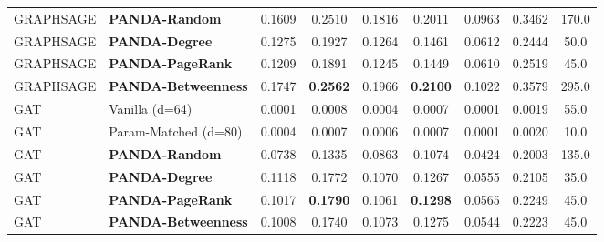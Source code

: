 \begin{table}[t]
{\begin{tabular}{llccccccc}
GRAPHSAGE & \textbf{PANDA-Random} & 0.1609 & 0.2510 & 0.1816 & 0.2011 & 0.0963 & 0.3462 & 170.0 \\
GRAPHSAGE & \textbf{PANDA-Degree} & 0.1275 & 0.1927 & 0.1264 & 0.1461 & 0.0612 & 0.2444 & 50.0 \\
GRAPHSAGE & \textbf{PANDA-PageRank} & 0.1209 & 0.1891 & 0.1245 & 0.1449 & 0.0610 & 0.2519 & 45.0 \\
GRAPHSAGE & \textbf{PANDA-Betweenness} & 0.1747 & \textbf{0.2562} & 0.1966 & \textbf{0.2100} & 0.1022 & 0.3579 & 295.0 \\
\midrule
GAT & Vanilla (d=64) & 0.0001 & 0.0008 & 0.0004 & 0.0007 & 0.0001 & 0.0019 & 55.0 \\
GAT & Param-Matched (d=80) & 0.0004 & 0.0007 & 0.0006 & 0.0007 & 0.0001 & 0.0020 & 10.0 \\
GAT & \textbf{PANDA-Random} & 0.0738 & 0.1335 & 0.0863 & 0.1074 & 0.0424 & 0.2003 & 135.0 \\
GAT & \textbf{PANDA-Degree} & 0.1118 & 0.1772 & 0.1070 & 0.1267 & 0.0555 & 0.2105 & 35.0 \\
GAT & \textbf{PANDA-PageRank} & 0.1017 & \textbf{0.1790} & 0.1061 & \textbf{0.1298} & 0.0565 & 0.2249 & 45.0 \\
GAT & \textbf{PANDA-Betweenness} & 0.1008 & 0.1740 & 0.1073 & 0.1275 & 0.0544 & 0.2223 & 45.0 \\
\bottomrule
\end{tabular}
}
\end{table}
